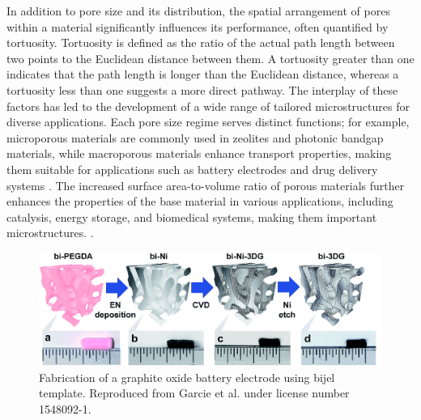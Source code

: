 In addition to pore size and its distribution, the spatial arrangement of pores within a material significantly influences its performance, 
often quantified by tortuosity. Tortuosity is defined as the ratio of the actual path length between two points to the Euclidean distance 
between them. A tortuosity greater than one indicates that the path length is longer than the Euclidean distance, whereas a tortuosity less 
than one suggests a more direct pathway. The interplay of these factors has led to the development of a wide range of tailored microstructures 
for diverse applications. Each pore size regime serves distinct functions; for example, microporous materials are commonly used in zeolites and 
photonic bandgap materials, while macroporous materials enhance transport properties, making them suitable for applications such as battery 
electrodes and drug delivery systems \cite{chen_tortuosity_2020, ebner_tortuosity_2014}. The increased surface area-to-volume ratio of porous 
materials further enhances the properties of the base material in various applications, including catalysis, energy storage, and biomedical 
systems, making them important microstructures. \cite{cha_bicontinuous_2019, samdani_bicontinuous_2017, thorson_bijel-templated_2019, zhao_highly_2014}.  

\begin{figure}
    \centering
    \includegraphics[scale = 0.5]{figures/introduction/bijel_templating.png}
    \caption{Fabrication of a graphite oxide battery electrode using bijel template. Reproduced from Garcie et al. under license number 1548092-1. \cite{garcia_scalable_2019}}
    \label{fig:bijel_template}
\end{figure}

